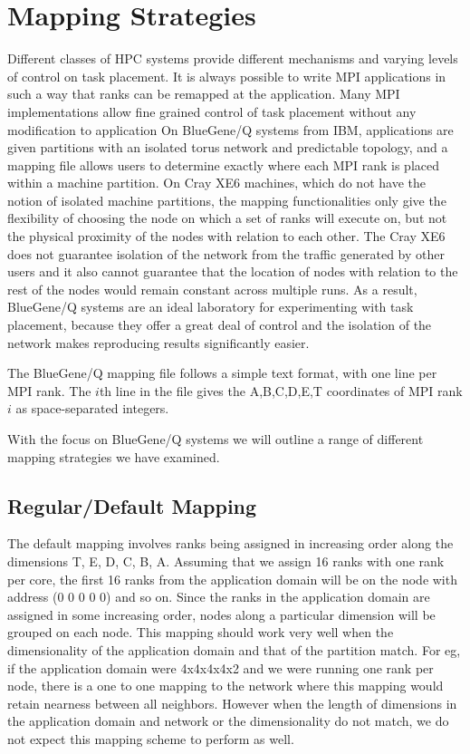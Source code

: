 \documentclass{acm_proc_article-sp}
\begin{document}
\section{Mapping Strategies}\label{sect:mapping}
Different classes of HPC systems provide different mechanisms and varying levels of control on task placement.
It is always possible to write MPI applications in such a way that ranks can
be remapped at the application.  Many MPI implementations allow 
fine grained control of task placement without any modification to application
On BlueGene/Q systems from IBM, applications are given partitions with
an isolated torus network and predictable topology, and a mapping file
allows users to determine exactly where
each MPI rank is placed within a machine partition. On Cray XE6 machines, which do not have the notion of
isolated machine partitions, the mapping functionalities only give the flexibility of choosing the node on
which a set of ranks will execute on, but not the physical proximity of the nodes with relation to each other.
The Cray XE6 does not guarantee isolation of the network from the traffic generated by other users and it
also cannot guarantee that the location of nodes with relation to the rest of the nodes would remain constant
across multiple runs. As a result, BlueGene/Q systems are an ideal laboratory
for experimenting with task placement, because they offer a great deal of
control and the isolation of the network makes reproducing results
significantly easier.

The BlueGene/Q mapping file follows a simple text format, with one
line per MPI rank.  The $i$th line in the file gives the A,B,C,D,E,T
coordinates of MPI rank $i$ as space-separated integers.

With the focus on BlueGene/Q systems we will outline a range of different mapping strategies we have examined.

\subsection{Regular/Default Mapping}
The default mapping involves ranks being assigned in increasing order along the dimensions T, E, D, C, B, A.
Assuming that we assign 16 ranks with one rank per core, the first 16 ranks from the application domain will
be on the node with address (0 0 0 0 0) and so on. Since the ranks in the application domain are assigned in
some increasing order, nodes along a particular dimension will be grouped on each node. This mapping should work
very well when the dimensionality of the application domain and that of the partition match. For eg, if the
application domain were 4x4x4x4x2 and we were running one rank per node, there is a one to one mapping to the
network where this mapping would retain nearness between all neighbors. However when the length of dimensions
in the application domain and network or the dimensionality do not match, we do not expect this mapping scheme to perform as well.
\end{document}
